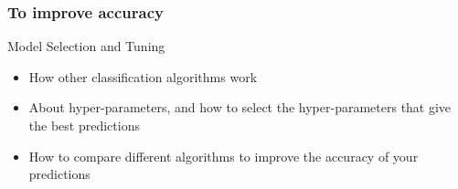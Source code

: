 \begin{frame}[fragile]\frametitle{To improve accuracy}
Model Selection and Tuning 
\begin{itemize}
\item 
    How other classification algorithms work
\item About hyper-parameters, and how to select the hyper-parameters that give the best predictions
\item  How to compare different algorithms to improve the accuracy of your predictions
\end{itemize}
\end{frame}

